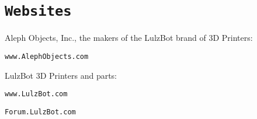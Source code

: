 \section{\texttt{Websites}}

Aleph Objects, Inc., the makers of the LulzBot\textsuperscript{\miniscule{\textregistered}} brand of 3D Printers:

\texttt{www.AlephObjects.com}


LulzBot 3D Printers and parts:

\texttt{www.LulzBot.com}

\texttt{Forum.LulzBot.com}
